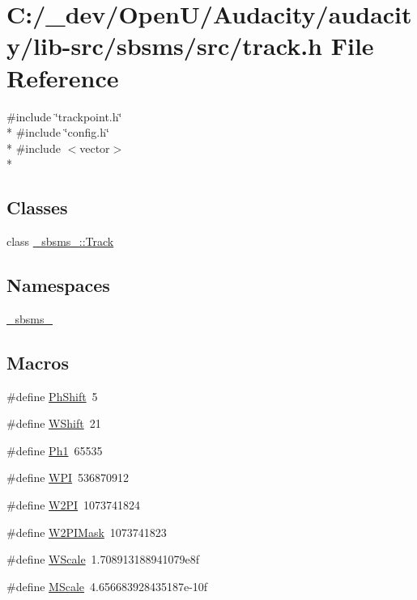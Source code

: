 \hypertarget{lib-src_2sbsms_2src_2track_8h}{}\section{C\+:/\+\_\+dev/\+Open\+U/\+Audacity/audacity/lib-\/src/sbsms/src/track.h File Reference}
\label{lib-src_2sbsms_2src_2track_8h}
{\ttfamily \#include \char`\"{}trackpoint.\+h\char`\"{}}\\*
{\ttfamily \#include \char`\"{}config.\+h\char`\"{}}\\*
{\ttfamily \#include $<$vector$>$}\\*
\subsection*{Classes}
\begin{DoxyCompactItemize}
\item 
class \hyperlink{class__sbsms___1_1_track}{\+\_\+sbsms\+\_\+\+::\+Track}
\end{DoxyCompactItemize}
\subsection*{Namespaces}
\begin{DoxyCompactItemize}
\item 
 \hyperlink{namespace__sbsms__}{\+\_\+sbsms\+\_\+}
\end{DoxyCompactItemize}
\subsection*{Macros}
\begin{DoxyCompactItemize}
\item 
\#define \hyperlink{lib-src_2sbsms_2src_2track_8h_a1f97fc8b28e480f40534787f39b90c9e}{Ph\+Shift}~5
\item 
\#define \hyperlink{lib-src_2sbsms_2src_2track_8h_a2b8843acad228e9cf88ad12507920d98}{W\+Shift}~21
\item 
\#define \hyperlink{lib-src_2sbsms_2src_2track_8h_ad657dc616a13678a5c3c964a796a393f}{Ph1}~65535
\item 
\#define \hyperlink{lib-src_2sbsms_2src_2track_8h_a778760eada4f8afa20058d0c08a810d7}{W\+PI}~536870912
\item 
\#define \hyperlink{lib-src_2sbsms_2src_2track_8h_abfc65a1034bec6a7d81f3ff368d2febf}{W2\+PI}~1073741824
\item 
\#define \hyperlink{lib-src_2sbsms_2src_2track_8h_aee3867e1aefaaa08143c7854041e3eff}{W2\+P\+I\+Mask}~1073741823
\item 
\#define \hyperlink{lib-src_2sbsms_2src_2track_8h_a45fec6fa7488d43660c17f575f08c17c}{W\+Scale}~1.\+708913188941079e8f
\item 
\#define \hyperlink{lib-src_2sbsms_2src_2track_8h_af834a1d6a5d0769ee6a01d675b3201d5}{M\+Scale}~4.\+656683928435187e-\/10f
\end{DoxyCompactItemize}
